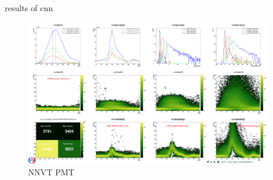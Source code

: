 \documentclass[11pt,compress,xcolor=x11names,UTF8]{beamer}
\begin{document}
\begin{frame}{results of cnn}
\begin{figure}
\centering
\vspace{-.4cm}
\includegraphics[width=0.968\textwidth]{cnnmcp} %
	\caption{NNVT PMT}
\end{figure}
\end{frame}
\end{document}
